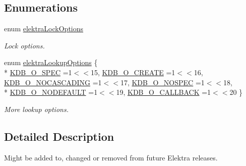 \subsection*{Enumerations}
\begin{DoxyCompactItemize}
\item 
\hypertarget{group__proposal_ga824e384e248ed1e05448294bff7271c0}{enum \hyperlink{group__proposal_ga824e384e248ed1e05448294bff7271c0}{elektra\+Lock\+Options} }\label{group__proposal_ga824e384e248ed1e05448294bff7271c0}

\begin{DoxyCompactList}\small\item\em Lock options. \end{DoxyCompactList}\item 
enum \hyperlink{group__proposal_ga93673533c4c8eb1fdfca76b98c5f49b0}{elektra\+Lookup\+Options} \{ \\*
\hyperlink{group__proposal_gga93673533c4c8eb1fdfca76b98c5f49b0a187bc7e52493fb8f1eb5693015478dae}{K\+D\+B\+\_\+\+O\+\_\+\+S\+P\+E\+C} =1$<$$<$15, 
\hyperlink{group__proposal_gga93673533c4c8eb1fdfca76b98c5f49b0a72155bedec545b2e96372ab28169620a}{K\+D\+B\+\_\+\+O\+\_\+\+C\+R\+E\+A\+T\+E} =1$<$$<$16, 
\hyperlink{group__proposal_gga93673533c4c8eb1fdfca76b98c5f49b0abc4c6e04823b6d684f4db8df3b84f326}{K\+D\+B\+\_\+\+O\+\_\+\+N\+O\+C\+A\+S\+C\+A\+D\+I\+N\+G} =1$<$$<$17, 
\hyperlink{group__proposal_gga93673533c4c8eb1fdfca76b98c5f49b0a420d8ea3671ffea4fe8400570cfe5c8d}{K\+D\+B\+\_\+\+O\+\_\+\+N\+O\+S\+P\+E\+C} =1$<$$<$18, 
\\*
\hyperlink{group__proposal_gga93673533c4c8eb1fdfca76b98c5f49b0abdcfd6d28200b5c650615fba430496bb}{K\+D\+B\+\_\+\+O\+\_\+\+N\+O\+D\+E\+F\+A\+U\+L\+T} =1$<$$<$19, 
\hyperlink{group__proposal_gga93673533c4c8eb1fdfca76b98c5f49b0a70ac5d04d6f855e17e4c33dfeeddd39e}{K\+D\+B\+\_\+\+O\+\_\+\+C\+A\+L\+L\+B\+A\+C\+K} =1$<$$<$20
 \}
\begin{DoxyCompactList}\small\item\em More lookup options. \end{DoxyCompactList}\end{DoxyCompactItemize}


\subsection{Detailed Description}
Might be added to, changed or removed from future Elektra releases. 



